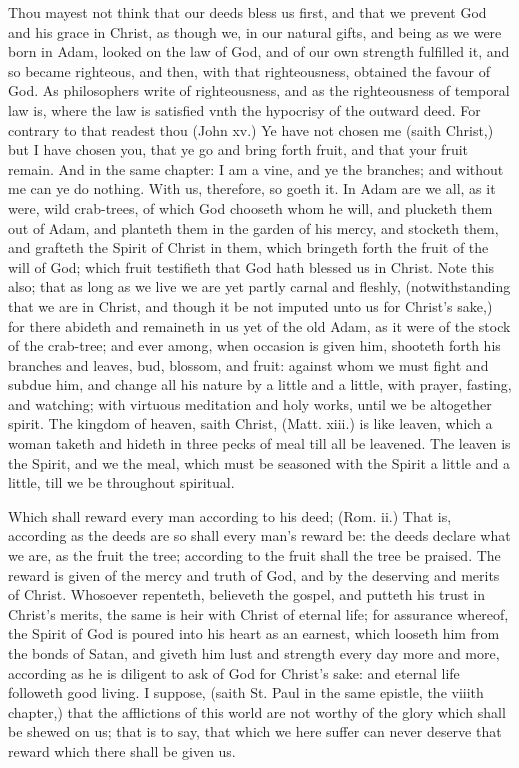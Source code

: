 Thou mayest not think that our deeds bless us first, and 
that we prevent God and his grace in Christ, as though 
we, in our natural gifts, and being as we were born in 
Adam, looked on the law of God, and of our own strength 
fulfilled it, and so became righteous, and then, with that 
righteousness, obtained the favour of God. As philosophers
write of righteousness, and as the righteousness of 
temporal law is, where the law is satisfied vnth the hypocrisy
of the outward deed. For contrary to that readest 
thou (John xv.) Ye have not chosen me (saith Christ,) but 
I have chosen you, that ye go and bring forth fruit, and 
that your fruit remain. And in the same chapter: I am 
a vine, and ye the branches; and without me can ye do 
nothing. With us, therefore, so goeth it. In Adam are 
we all, as it were, wild crab-trees, of which God chooseth 
whom he will, and plucketh them out of Adam, and 
planteth them in the garden of his mercy, and stocketh 
them, and grafteth the Spirit of Christ in them, which 
bringeth forth the fruit of the will of God; which fruit 
testifieth that God hath blessed us in Christ. Note this 
also; that as long as we live we are yet partly carnal and 
fleshly, (notwithstanding that we are in Christ, and though 
it be not imputed unto us for Christ's sake,) for there abideth 
and remaineth in us yet of the old Adam, as it were of the 
stock of the crab-tree; and ever among, when occasion is 
given him, shooteth forth his branches and leaves, bud, 
blossom, and fruit: against whom we must fight and subdue
him, and change all his nature by a little and a little, with
prayer, fasting, and watching; with virtuous meditation and
holy works, until we be altogether spirit. The kingdom of
heaven, saith Christ, (Matt. xiii.) is like leaven, which a
woman taketh and hideth in three pecks of meal till all 
be leavened. The leaven is the Spirit, and we the meal, 
which must be seasoned with the Spirit a little and a little,
till we be throughout spiritual. 

Which shall reward every man according to his deed; 
(Rom. ii.) That is, according as the deeds are so shall every
man's reward be: the deeds declare what we are, as the 
fruit the tree; according to the fruit shall the tree be 
praised. The reward is given of the mercy and truth of 
God, and by the deserving and merits of Christ. Whosoever
repenteth, believeth the gospel, and putteth his trust 
in Christ's merits, the same is heir with Christ of eternal 
life; for assurance whereof, the Spirit of God is poured 
into his heart as an earnest, which looseth him from the 
bonds of Satan, and giveth him lust and strength every 
day more and more, according as he is diligent to ask of 
God for Christ's sake: and eternal life followeth good 
living. I suppose, (saith St. Paul in the same epistle, the 
viiith chapter,) that the afflictions of this world are not
worthy of the glory which shall be shewed on us; that is 
to say, that which we here suffer can never deserve that 
reward which there shall be given us. 

